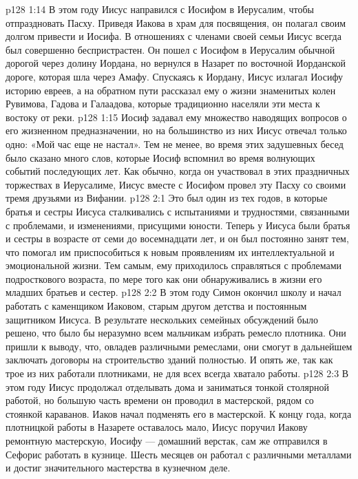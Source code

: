 \vs p128 1:14 \pc В этом году Иисус направился с Иосифом в Иерусалим, чтобы отпраздновать Пасху. Приведя Иакова в храм для посвящения, он полагал своим долгом привести и Иосифа. В отношениях с членами своей семьи Иисус всегда был совершенно беспристрастен. Он пошел с Иосифом в Иерусалим обычной дорогой через долину Иордана, но вернулся в Назарет по восточной Иорданской дороге, которая шла через Амафу. Спускаясь к Иордану, Иисус излагал Иосифу историю евреев, а на обратном пути рассказал ему о жизни знаменитых колен Рувимова, Гадова и Галаадова, которые традиционно населяли эти места к востоку от реки.
\vs p128 1:15 Иосиф задавал ему множество наводящих вопросов о его жизненном предназначении, но на большинство из них Иисус отвечал только одно: «Мой час еще не настал». Тем не менее, во время этих задушевных бесед было сказано много слов, которые Иосиф вспомнил во время волнующих событий последующих лет. Как обычно, когда он участвовал в этих праздничных торжествах в Иерусалиме, Иисус вместе с Иосифом провел эту Пасху со своими тремя друзьями из Вифании.
\vs p128 2:1 Это был один из тех годов, в которые братья и сестры Иисуса сталкивались с испытаниями и трудностями, связанными с проблемами, и изменениями, присущими юности. Теперь у Иисуса были братья и сестры в возрасте от семи до восемнадцати лет, и он был постоянно занят тем, что помогал им приспособиться к новым проявлениям их интеллектуальной и эмоциональной жизни. Тем самым, ему приходилось справляться с проблемами подросткового возраста, по мере того как они обнаруживались в жизни его младших братьев и сестер.
\vs p128 2:2 В этом году Симон окончил школу и начал работать с каменщиком Иаковом, старым другом детства и постоянным защитником Иисуса. В результате нескольких семейных обсуждений было решено, что было бы неразумно всем мальчикам избрать ремесло плотника. Они пришли к выводу, что, овладев различными ремеслами, они смогут в дальнейшем заключать договоры на строительство зданий полностью. И опять же, так как трое из них работали плотниками, не для всех всегда хватало работы.
\vs p128 2:3 В этом году Иисус продолжал отделывать дома и заниматься тонкой столярной работой, но большую часть времени он проводил в мастерской, рядом со стоянкой караванов. Иаков начал подменять его в мастерской. К концу года, когда плотницкой работы в Назарете оставалось мало, Иисус поручил Иакову ремонтную мастерскую, Иосифу --- домашний верстак, сам же отправился в Сефорис работать в кузнице. Шесть месяцев он работал с различными металлами и достиг значительного мастерства в кузнечном деле.
